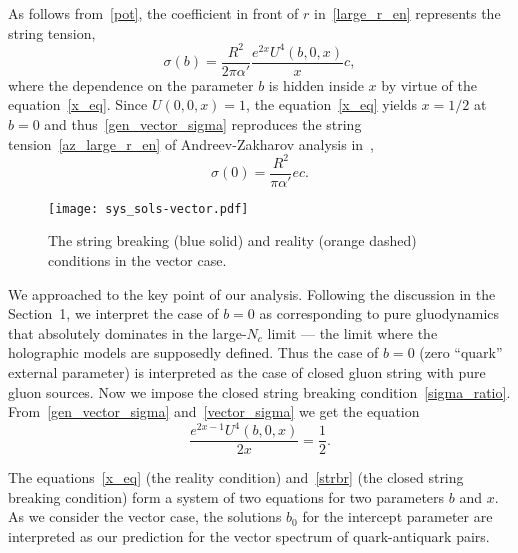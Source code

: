 \documentclass[a4paper,11pt]{article}
\begin{document}
As follows from~\eqref{pot}, the coefficient in front of \(r\) in~\eqref{large_r_en}
represents the string tension,
\begin{equation}
\label{gen_vector_sigma}
  \sigma(b)=\frac{R^2}{2\pi\alpha'}\frac{e^{2x}U^4(b,0,x)}{x}c,
\end{equation}
where the dependence on the parameter \(b\) is hidden inside \(x\) by virtue of the
equation~\eqref{x_eq}. Since \(U(0,0,x)=1\), the equation~\eqref{x_eq} yields \(x=1/2\) at $b=0$
and thus~\eqref{gen_vector_sigma} reproduces the string tension~\eqref{az_large_r_en} of
Andreev-Zakharov analysis in~\cite{Andreev:2006ct},
\begin{equation}
\label{vector_sigma}
  \sigma(0)=\frac{R^2}{\pi\alpha'}ec.
\end{equation}

\begin{wrapfigure}{R}{0.4\textwidth}
  \vspace{-7mm}
  \begin{center}
    \texttt{[image: sys\_sols-vector.pdf]}
  \end{center}
  \vspace*{-7mm}
  \caption{\footnotesize The string breaking (blue solid) and reality (orange
  dashed) conditions in the vector case.}
  \vspace*{1mm}
  \label{sys_sols_vector}
\end{wrapfigure}

We approached to the key point of our analysis. Following the discussion in the Section~1, we
interpret the case of $b=0$ as corresponding to pure gluodynamics that absolutely dominates
in the large-$N_c$ limit --- the limit where the holographic models are supposedly defined.
Thus the case of $b=0$ (zero ``quark'' external parameter) is interpreted as the case of closed gluon
string with pure gluon sources. Now we impose the closed string breaking condition~\eqref{sigma_ratio}.
From~\eqref{gen_vector_sigma} and~\eqref{vector_sigma} we get the equation
\begin{equation}
\label{strbr}
  \frac{e^{2x-1}U^4(b,0,x)}{2x}=\frac{1}{2}.
\end{equation}

The equations~\eqref{x_eq} (the reality condition) and~\eqref{strbr} (the closed string breaking condition) form a system of two equations for two parameters
\(b\) and \(x\). As we consider the vector case, the solutions $b_0$ for the intercept parameter are interpreted as our prediction
for the vector spectrum of quark-antiquark pairs.
\end{document}
